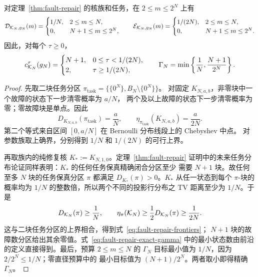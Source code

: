\begin{corollary}[故障--修复族的完整有限规模前沿]
\label{cor:fault-repair-frontier}
对定理~\ref{thm:fault-repair} 的核族和任务，在
$2\le m\le2^N$ 上有
\begin{equation}
\mathcal D_{\mathcal K_N,g_N}(m)=
\begin{cases}
1/N,&2\le m\le N,\\
0,&N+1\le m\le2^N,
\end{cases}
\qquad
\mathcal E_{\mathcal K_N,g_N}(m)=
\begin{cases}
1/(2N),&2\le m\le N,\\
0,&N+1\le m\le2^N.
\end{cases}
\label{eq:fault-repair-frontiers}
\end{equation}
因此，对每个 $\tau\ge0$，
\begin{equation}
c_{\mathcal K_N}^{\tau}(g_N)=
\begin{cases}
N+1,&0\le\tau<1/(2N),\\
2,&\tau\ge1/(2N),
\end{cases}
\qquad
\Gamma_N=\min\left\{\frac1N,\frac{N+1}{2^N}\right\}.
\label{eq:fault-repair-exact-gamma}
\end{equation}
\end{corollary}

\begin{proof}
先取二块任务分区
$\pi_{\mathrm{task}}=\{\{0^N\},B_N\setminus\{0^N\}\}$。
对固定 $K_{N,a,b}$，非零块中一个故障的状态下一步清零概率为 $a/N$，
两个及以上故障的状态下一步清零概率为零；零故障块是单点。因此
\[
D_{K_{N,a,b}}(\pi_{\mathrm{task}})=\frac aN,
\qquad
\eta_{\pi_{\mathrm{task}}}(K_{N,a,b})=\frac a{2N}.
\]
第二个等式来自区间 $[0,a/N]$ 在 Bernoulli 分布线段上的 Chebyshev 中点。
对参数族取上确界，分别得到 $1/N$ 和 $1/(2N)$ 的可行上界。

再取族内的纯修复核 $K_*:=K_{N,1,0}$。定理~\ref{thm:fault-repair}
证明中的未来任务分布论证同样表明：$K_*$ 的任何任务保真精确闭合分区至少
需要 $N+1$ 块。故任何至多 $N$ 块的任务保真分区 $\pi$ 都满足
$D_{K_*}(\pi)>0$。$K_*$ 从任一状态到每个 $\pi$-块的概率均为 $1/N$
的整数倍，所以两个不同的投影行分布之 TV 距离至少为 $1/N$。于是
\[
D_{\mathcal K_N}(\pi)\ge\frac1N,
\qquad
\eta_\pi(\mathcal K_N)\ge\frac12D_{\mathcal K_N}(\pi)\ge\frac1{2N}.
\]
这与二块任务分区的上界相合，得到式~\eqref{eq:fault-repair-frontiers}；
$N+1$ 块的故障数分区给出其余零值。式~\eqref{eq:fault-repair-exact-gamma}
中的最小状态数由前沿的定义直接得到。最后，预算 $2\le m\le N$ 的
$\Gamma_N$ 目标最小值为 $1/N$，因为 $2/2^N\le1/N$；零直径预算中的
最小目标值为 $(N+1)/2^N$。两者取小即得精确 $\Gamma_N$。
\end{proof}

